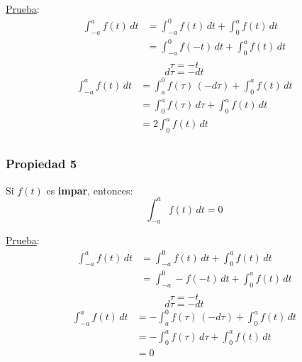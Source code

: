 \underline{Prueba}:
\begin{equation*}
\begin{split}
    \int_{-a}^a f(t)\,dt
        &=\int_{-a}^0 f(t)\,dt+\int_0^a f(t)\,dt\\
        &=\int_{-a}^0 f(-t)\,dt+\int_0^a f(t)\,dt\\
\end{split}
\end{equation*}
\begin{equation*}
    \tau=-t
\end{equation*}
\begin{equation*}
    d\tau=-dt
\end{equation*}
\begin{equation*}
\begin{split}
    \int_{-a}^a f(t)\,dt
        &=\int_a^0 f(\tau)\,(-d\tau)+\int_0^a f(t)\,dt\\
        &=\int_0^a f(\tau)\,d\tau+\int_0^a f(t)\,dt\\
        &=2\int_0^a f(t)\,dt\\
\end{split}
\end{equation*}

\subsubsection*{Propiedad 5}
Si $f(t)$ es \textbf{impar}, entonces:
\begin{equation}
    \int_{-a}^a f(t)\,dt=0
\end{equation}
\begin{figure}[H]
    \centering
    
\end{figure}

\underline{Prueba}:
\begin{equation*}
\begin{split}
    \int_{-a}^a f(t)\,dt
        &=\int_{-a}^0 f(t)\,dt+\int_0^a f(t)\,dt\\
        &=\int_{-a}^0 -f(-t)\,dt+\int_0^a f(t)\,dt\\
\end{split}
\end{equation*}
\begin{equation*}
    \tau=-t
\end{equation*}
\begin{equation*}
    d\tau=-dt
\end{equation*}
\begin{equation*}
\begin{split}
    \int_{-a}^a f(t)\,dt
        &=-\int_a^0 f(\tau)\,(-d\tau)+\int_0^a f(t)\,dt\\
        &=-\int_0^a f(\tau)\,d\tau+\int_0^a f(t)\,dt\\
        &=0\\
\end{split}
\end{equation*}

